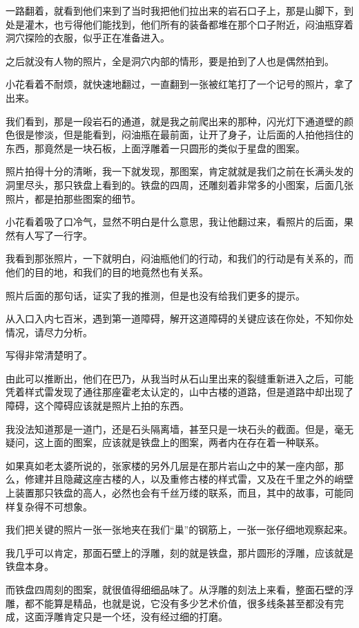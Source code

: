 一路翻着，就看到他们来到了当时我把他们拉出来的岩石口子上，那是山脚下，到处是灌木，也亏得他们能找到，他们所有的装备都堆在那个口子附近，闷油瓶穿着洞穴探险的衣服，似乎正在准备进入。

之后就没有人物的照片，全是洞穴内部的情形，要是拍到了人也是偶然拍到。

小花看着不耐烦，就快速地翻过，一直翻到一张被红笔打了一个记号的照片，拿了出来。

我们看到，那是一段岩石的通道，就是我之前爬出来的那种，闪光灯下通道壁的颜色很是惨淡，但是能看到，闷油瓶在最前面，让开了身子，让后面的人拍他挡住的东西，那竟然是一块石板，上面浮雕着一只圆形的类似于星盘的图案。

照片拍得十分的清晰，我一下就发现，那图案，肯定就就是我们之前在长满头发的洞里尽头，那只铁盘上看到的。铁盘的四周，还雕刻着非常多的小图案，后面几张照片，都是拍那些图案的细节。

小花看着吸了口冷气，显然不明白是什么意思，我让他翻过来，看照片的后面，果然有人写了一行字。

我看到那张照片，一下就明白，闷油瓶他们的行动，和我们的行动是有关系的，而他们的目的地，和我们的目的地竟然也有关系。

照片后面的那句话，证实了我的推测，但是也没有给我们更多的提示。

从入口入内七百米，遇到第一道障碍，解开这道障碍的关键应该在你处，不知你处情况，请尽力分析。

写得非常清楚明了。

由此可以推断出，他们在巴乃，从我当时从石山里出来的裂缝重新进入之后，可能凭着样式雷发现了通往那座霍老太认定的，山中古楼的道路，但是道路中却出现了障碍，这个障碍应该就是照片上拍的东西。

我没法知道那是一道门，还是石头隔离墙，甚至只是一块石头的截面。但是，毫无疑问，这上面的图案，应该就是铁盘上的图案，两者内在存在着一种联系。

如果真如老太婆所说的，张家楼的另外几层是在那片岩山之中的某一座内部，那么，修建并且隐藏这座古楼的人，以及重修古楼的样式雷，又及在千里之外的峭壁上装置那只铁盘的高人，必然也会有千丝万缕的联系，而且，其中的故事，可能同样复杂得不可想象。

我们把关键的照片一张一张地夹在我们“巢”的钢筋上，一张一张仔细地观察起来。

我几乎可以肯定，那面石壁上的浮雕，刻的就是铁盘，那片圆形的浮雕，应该就是铁盘本身。

而铁盘四周刻的图案，就很值得细细品味了。从浮雕的刻法上来看，整面石壁的浮雕，都不能算是精品，也就是说，它没有多少艺术价值，很多线条甚至都没有完成，这面浮雕肯定只是一个坯，没有经过细的打磨。

